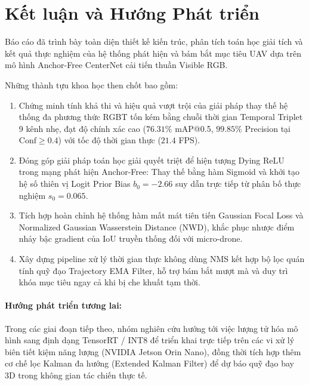 \documentclass[11pt,a4paper]{article}
\begin{document}
\section{Kết luận và Hướng Phát triển}

Báo cáo đã trình bày toàn diện thiết kế kiến trúc, phân tích toán học giải tích và kết quả thực nghiệm của hệ thống phát hiện và bám bắt mục tiêu UAV dựa trên mô hình Anchor-Free CenterNet cải tiến thuần Visible RGB.

Những thành tựu khoa học then chốt bao gồm:
\begin{enumerate}
    \item Chứng minh tính khả thi và hiệu quả vượt trội của giải pháp thay thế hệ thống đa phương thức RGBT tốn kém bằng chuỗi thời gian Temporal Triplet 9 kênh nhẹ, đạt độ chính xác cao ($76.31\%$ mAP@0.5, $99.85\%$ Precision tại $\text{Conf} \ge 0.4$) với tốc độ thời gian thực ($21.4$ FPS).
    \item Đóng góp giải pháp toán học giải quyết triệt để hiện tượng Dying ReLU trong mạng phát hiện Anchor-Free: Thay thế bằng hàm Sigmoid và khởi tạo hệ số thiên vị Logit Prior Bias $b_0 = -2.66$ suy dẫn trực tiếp từ phân bố thực nghiệm $s_0 = 0.065$.
    \item Tích hợp hoàn chỉnh hệ thống hàm mất mát tiên tiến Gaussian Focal Loss và Normalized Gaussian Wasserstein Distance (NWD), khắc phục nhược điểm nhảy bậc gradient của IoU truyền thống đối với micro-drone.
    \item Xây dựng pipeline xử lý thời gian thực không dùng NMS kết hợp bộ lọc quán tính quỹ đạo Trajectory EMA Filter, hỗ trợ bám bắt mượt mà và duy trì khóa mục tiêu ngay cả khi bị che khuất tạm thời.
\end{enumerate}

\paragraph{Hướng phát triển tương lai:}
Trong các giai đoạn tiếp theo, nhóm nghiên cứu hướng tới việc lượng tử hóa mô hình sang định dạng TensorRT / INT8 để triển khai trực tiếp trên các vi xử lý biên tiết kiệm năng lượng (NVIDIA Jetson Orin Nano), đồng thời tích hợp thêm cơ chế lọc Kalman đa hướng (Extended Kalman Filter) để dự báo quỹ đạo bay 3D trong không gian tác chiến thực tế.
\end{document}
